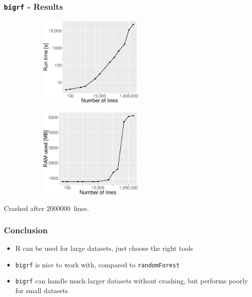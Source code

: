 \documentclass[11pt, compress]{beamer}
\begin{document}
\begin{frame}[fragile]
  \frametitle{\texttt{bigrf} - Results}
  \begin{figure}[ht]
    \begin{subfigure}[t]{0.49\textwidth}
        \centering
        \includegraphics[height=4.5cm]{bigrf_time.eps}
    \end{subfigure}%
    \begin{subfigure}[t]{0.49\textwidth}
        \centering
        \includegraphics[height=4.5cm]{bigrf_ram.eps}
    \end{subfigure}
\end{figure}

    Crashed after \SI{2000000}{lines}.
  
 
\end{frame}

\begin{frame}[fragile]
  \frametitle{Conclusion}

  \begin{itemize}
    \item R can be used for large datasets, just choose the right tools
    \item \texttt{bigrf} is nice to work with, compared to \texttt{randomForest}
    \item \texttt{bigrf} can handle much larger datasets without crashing, but performs poorly for small datasets
\end{itemize}
\end{frame}


\end{document}
